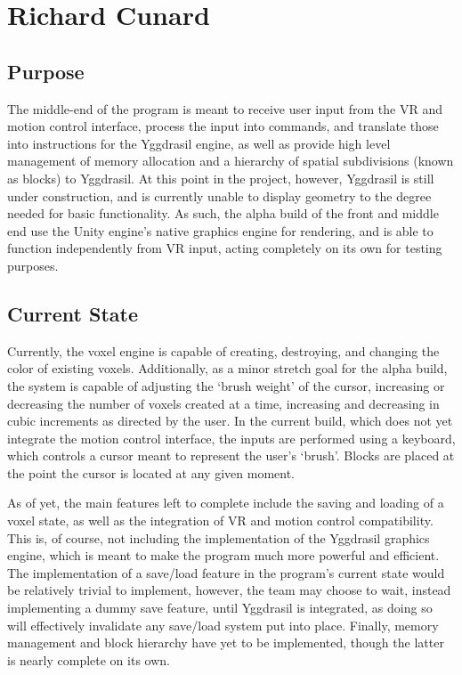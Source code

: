 \documentclass[onecolumn, draftclsnofoot,10pt, compsoc]{IEEEtran}
\begin{document}
\section{Richard Cunard}
\subsection{Purpose}
The middle-end of the program is meant to receive user input from the VR and motion control interface, process the input into commands, and translate those into instructions for the Yggdrasil engine, as well as provide high level management of memory allocation and a hierarchy of spatial subdivisions (known as blocks) to Yggdrasil. At this point in the project, however, Yggdrasil is still under construction, and is currently unable to display geometry to the degree needed for basic functionality. As such, the alpha build of the front and middle end use the Unity engine’s native graphics engine for rendering, and is able to function independently from VR input, acting completely on its own for testing purposes.

\subsection{Current State}
Currently, the voxel engine is capable of creating, destroying, and changing the color of existing voxels. Additionally, as a minor stretch goal for the alpha build, the system is capable of adjusting the ‘brush weight’ of the cursor, increasing or decreasing the number of voxels created at a time, increasing and decreasing in cubic increments as directed by the user. In the current build, which does not yet integrate the motion control interface, the inputs are performed using a keyboard, which controls a cursor meant to represent the user’s ‘brush’. Blocks are placed at the point the cursor is located at any given moment.

As of yet, the main features left to complete include the saving and loading of a voxel state, as well as the integration of VR and motion control compatibility. This is, of course, not including the implementation of the Yggdrasil graphics engine, which is meant to make the program much more powerful and efficient. The implementation of a save/load feature in the program’s current state would be relatively trivial to implement, however, the team may choose to wait, instead implementing a dummy save feature, until Yggdrasil is integrated, as doing so will effectively invalidate any save/load system put into place. Finally, memory management and block hierarchy have yet to be implemented, though the latter is nearly complete on its own.
\end{document}
